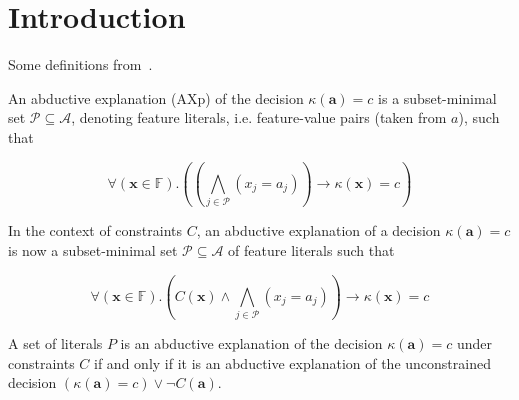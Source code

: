 
\section{Introduction}

Some definitions from~\cite{CooperMS23}.

\begin{definition}
An abductive explanation (AXp) of the decision $\kappa(\mathbf{a}) = c$ is a subset-minimal set $\mathcal{P} \subseteq \mathcal{A}$, denoting feature literals,
i.e. feature-value pairs (taken from $a$), such that

$$\forall (\mathbf{x} \in \mathbb{F}). \left( \left( \bigwedge_{j \in \mathcal{P}} (x_j = a_j) \right) \to \kappa(\mathbf{x}) = c \right)$$

\end{definition}


In the context of constraints $C$, an abductive explanation of a
decision $\kappa(\mathbf{a}) = c$ is now a subset-minimal set $\mathcal{P} \subseteq \mathcal{A}$ of feature literals such that

$$\forall (\mathbf{x} \in \mathbb{F}). \left( C(\mathbf{x}) \land \bigwedge_{j \in \mathcal{P}} (x_j = a_j) \right) \to \kappa(\mathbf{x}) = c $$

\begin{proposition}
    A set of literals $P$ is an abductive explanation of the decision $\kappa(\mathbf{a}) = c$ under constraints $C$ if and only if it is an
abductive explanation of the unconstrained decision $(\kappa(\mathbf{a}) = c) \lor \neg C(\mathbf{a})$.
\end{proposition}
